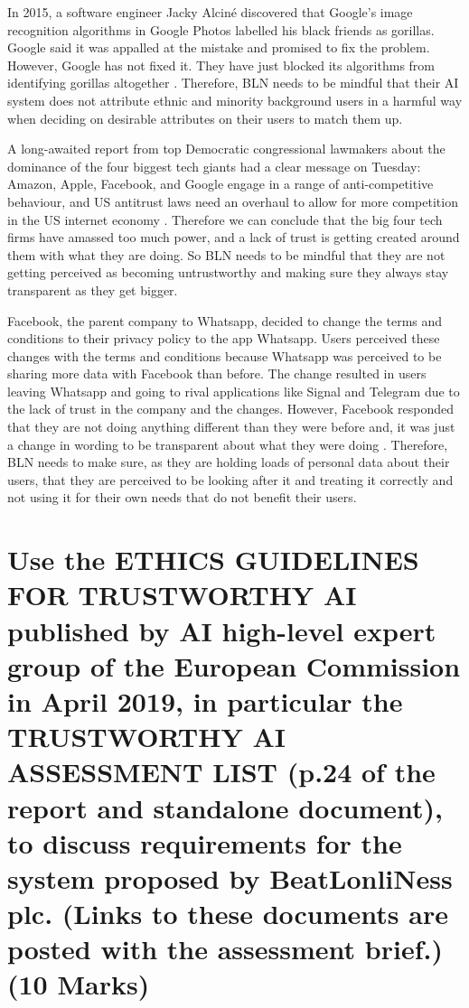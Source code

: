 \documentclass[a4paper,10pt]{article}
\begin{document}
	In 2015, a software engineer Jacky Alciné discovered that Google's image recognition algorithms in Google Photos labelled his black friends as gorillas. Google said it was appalled at the mistake and promised to fix the problem. However, Google has not fixed it. They have just blocked its algorithms from identifying gorillas altogether \cite{google_gorrila}. Therefore, BLN needs to be mindful that their AI system does not attribute ethnic and minority background users in a harmful way when deciding on desirable attributes on their users to match them up.
	
	A long-awaited report from top Democratic congressional lawmakers about the dominance of the four biggest tech giants had a clear message on Tuesday: Amazon, Apple, Facebook, and Google engage in a range of anti-competitive behaviour, and US antitrust laws need an overhaul to allow for more competition in the US internet economy \cite{recorde_big_tech}. Therefore we can conclude that the big four tech firms have amassed too much power, and a lack of trust is getting created around them with what they are doing. So BLN needs to be mindful that they are not getting perceived as becoming untrustworthy and making sure they always stay transparent as they get bigger. 
	
	Facebook, the parent company to Whatsapp, decided to change the terms and conditions to their privacy policy to the app Whatsapp. Users perceived these changes with the terms and conditions because Whatsapp was perceived to be sharing more data with Facebook than before. The change resulted in users leaving Whatsapp and going to rival applications like Signal and Telegram due to the lack of trust in the company and the changes. However, Facebook responded that they are not doing anything different than they were before and, it was just a change in wording to be transparent about what they were doing  \cite{whatsapp_fb_data}. Therefore, BLN needs to make sure, as they are holding loads of personal data about their users, that they are perceived to be looking after it and treating it correctly and not using it for their own needs that do not benefit their users.

	
\section{Use the ETHICS GUIDELINES FOR TRUSTWORTHY AI published by AI high-level expert group of the European Commission in April 2019, in particular the TRUSTWORTHY AI ASSESSMENT LIST (p.24 of the report and standalone document), to discuss requirements for the system proposed by BeatLonliNess plc. (Links to these documents are posted with the assessment brief.) (10 Marks)}
\end{document}
